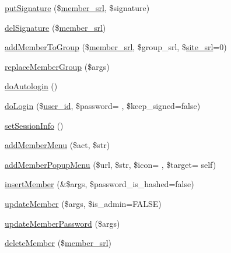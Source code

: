 \begin{DoxyCompactItemize}
\item 
\hyperlink{classmemberController_a084c3af4daea1a860f95e06f2bc5fc28}{put\+Signature} (\$\hyperlink{ko_8install_8php_aa61f9e08f0fe505094d26f8143f30bbd}{member\+\_\+srl}, \$signature)
\item 
\hyperlink{classmemberController_a0fa2ec662eb7a40333ca2049a103385e}{del\+Signature} (\$\hyperlink{ko_8install_8php_aa61f9e08f0fe505094d26f8143f30bbd}{member\+\_\+srl})
\item 
\hyperlink{classmemberController_aca7533f0e95df7227073436c24827c7b}{add\+Member\+To\+Group} (\$\hyperlink{ko_8install_8php_aa61f9e08f0fe505094d26f8143f30bbd}{member\+\_\+srl}, \$group\+\_\+srl, \$\hyperlink{ko_8install_8php_a8b1406b4ad1048041558dce6bfe89004}{site\+\_\+srl}=0)
\item 
\hyperlink{classmemberController_acc92443cdd02e55cec12099722482737}{replace\+Member\+Group} (\$args)
\item 
\hyperlink{classmemberController_aeb2590d01346c9a25c2b22f99429f6a3}{do\+Autologin} ()
\item 
\hyperlink{classmemberController_a92930ff9a5763ef9d6d292c7154269e4}{do\+Login} (\$\hyperlink{ko_8install_8php_a74f1a394389d774e5b4cd5d1d15413f7}{user\+\_\+id}, \$password= \textquotesingle{}\textquotesingle{}, \$keep\+\_\+signed=false)
\item 
\hyperlink{classmemberController_ae4175b4a60e0b3000ed12e36508720ad}{set\+Session\+Info} ()
\item 
\hyperlink{classmemberController_aaa52725f8ba9ba16cfe4b350a51d7420}{add\+Member\+Menu} (\$act, \$str)
\item 
\hyperlink{classmemberController_a91303fbd27713d1990f88b8dd3c09b2b}{add\+Member\+Popup\+Menu} (\$url, \$str, \$icon= \textquotesingle{}\textquotesingle{}, \$target= \textquotesingle{}self\textquotesingle{})
\item 
\hyperlink{classmemberController_ae588324b8e86b9259e40d104b4d2b42d}{insert\+Member} (\&\$args, \$password\+\_\+is\+\_\+hashed=false)
\item 
\hyperlink{classmemberController_ac1ad3397eda0a695046b023a14d25496}{update\+Member} (\$args, \$is\+\_\+admin=F\+A\+L\+S\+E)
\item 
\hyperlink{classmemberController_aed05d2a367f7e7a5b70fcbd0b4a08e74}{update\+Member\+Password} (\$args)
\item 
\hyperlink{classmemberController_a5170b3fafc449f4cc6fc599c093fcc06}{delete\+Member} (\$\hyperlink{ko_8install_8php_aa61f9e08f0fe505094d26f8143f30bbd}{member\+\_\+srl})
\item 

\end{DoxyCompactItemize}

